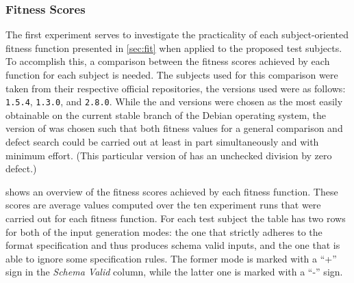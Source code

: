 \subsubsection{Fitness Scores}
The first experiment serves to investigate the practicality of each subject-oriented fitness function
presented in \cref{sec:fit} when applied to the proposed test subjects. To accomplish this, a comparison
between the fitness scores achieved by each function for each subject is needed.
The subjects used for this comparison were taken from their respective official repositories, the versions
used were as follows: \libpng \texttt{1.5.4}, \libpcap \texttt{1.3.0}, and \libxml \texttt{2.8.0}. While the
\libpcap and \libxml versions were chosen as the most easily obtainable on the current stable branch of the
Debian operating system, the version of \libpng was chosen such that both fitness values for a general
comparison and defect search could be carried out at least in part simultaneously and with minimum effort.
(This particular version of \libpng has an unchecked division by zero defect.)

 shows an overview of
the fitness scores achieved by each fitness function. These scores are average values computed over the ten
experiment runs that were carried out for each fitness function. For each test subject the table has two rows
for both of the input generation modes: the one that strictly adheres to the format specification and thus
produces schema valid inputs, and the one that is able to ignore some specification rules. The former mode is
marked with a ``+'' sign in the \emph{Schema Valid} column, while the latter one is marked with a ``-'' sign.

